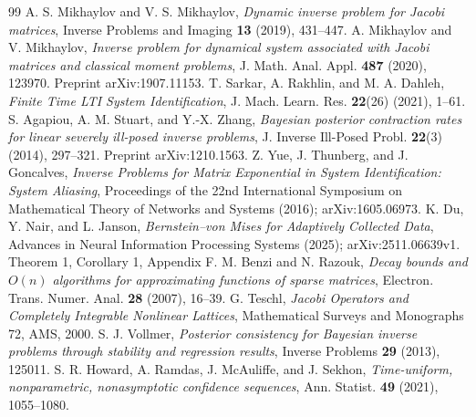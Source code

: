 \begin{thebibliography}{99}
 A. S. Mikhaylov and V. S. Mikhaylov,
\emph{Dynamic inverse problem for Jacobi matrices},
Inverse Problems and Imaging \textbf{13} (2019), 431--447.
 A. Mikhaylov and V. Mikhaylov,
\emph{Inverse problem for dynamical system associated with Jacobi matrices
and classical moment problems}, J. Math. Anal. Appl. \textbf{487} (2020),
123970. Preprint arXiv:1907.11153.
 T. Sarkar, A. Rakhlin, and M. A. Dahleh,
\emph{Finite Time LTI System Identification}, J. Mach. Learn. Res.
\textbf{22}(26) (2021), 1--61.
 S. Agapiou, A. M. Stuart, and Y.-X. Zhang,
\emph{Bayesian posterior contraction rates for linear severely ill-posed
inverse problems}, J. Inverse Ill-Posed Probl. \textbf{22}(3) (2014), 297--321.
Preprint arXiv:1210.1563.
 Z. Yue, J. Thunberg, and J. Goncalves,
\emph{Inverse Problems for Matrix Exponential in System Identification:
System Aliasing}, Proceedings of the 22nd International Symposium on
Mathematical Theory of Networks and Systems (2016); arXiv:1605.06973.
 K. Du, Y. Nair, and L. Janson,
\emph{Bernstein--von Mises for Adaptively Collected Data},
Advances in Neural Information Processing Systems (2025);
arXiv:2511.06639v1. Theorem 1, Corollary 1, Appendix F.
 M. Benzi and N. Razouk,
\emph{Decay bounds and $O(n)$ algorithms for approximating functions of sparse
matrices}, Electron. Trans. Numer. Anal. \textbf{28} (2007), 16--39.
 G. Teschl, \emph{Jacobi Operators and Completely Integrable
Nonlinear Lattices}, Mathematical Surveys and Monographs 72, AMS, 2000.
 S. J. Vollmer, \emph{Posterior consistency for Bayesian inverse
problems through stability and regression results}, Inverse Problems
\textbf{29} (2013), 125011.
 S. R. Howard, A. Ramdas, J. McAuliffe, and J. Sekhon,
\emph{Time-uniform, nonparametric, nonasymptotic confidence sequences},
Ann. Statist. \textbf{49} (2021), 1055--1080.
\end{thebibliography}

